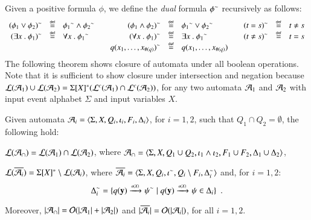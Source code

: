 Given a positive formula $\phi$, we define the \emph{dual} formula
${\phi}^{\sim}$ recursively as follows:
\[\begin{array}{rclcrclcrcl}
{(\phi_1 \vee \phi_2)}^{\sim} & \stackrel{\scriptscriptstyle{\mathsf{def}}}{=} & {\phi_1}^{\sim} \wedge {\phi_2}^{\sim} && 
{(\phi_1 \wedge \phi_2)}^{\sim} & \stackrel{\scriptscriptstyle{\mathsf{def}}}{=} & {\phi_1}^{\sim} \vee {\phi_2}^{\sim} &&
{(t = s)}^{\sim} & \stackrel{\scriptscriptstyle{\mathsf{def}}}{=} & t \neq s \\
{(\exists x ~.~ \phi_1)}^{\sim} & \stackrel{\scriptscriptstyle{\mathsf{def}}}{=} & \forall x ~.~ {\phi_1}^{\sim} && 
{(\forall x ~.~ \phi_1)}^{\sim} & \stackrel{\scriptscriptstyle{\mathsf{def}}}{=} & \exists x ~.~ {\phi_1}^{\sim} && 
{(t \neq s)}^{\sim} & \stackrel{\scriptscriptstyle{\mathsf{def}}}{=} & t = s \\
&&&& {q(x_1,\ldots,x_{\#(q)})}^{\sim} & \stackrel{\scriptscriptstyle{\mathsf{def}}}{=} & q(x_1,\ldots,x_{\#(q)})
\end{array}\]
The following theorem shows closure of automata under all boolean
operations. Note that it is sufficient to show closure under
intersection and negation because ${\mathcal L}({\mathcal{A}_1}) \cup {\mathcal L}({\mathcal{A}_2}) =
\Sigma[X]^* ({\mathcal L}^c({\mathcal{A}_1}) \cap {\mathcal L}^c({\mathcal{A}_2}))$, for any two automata
$\mathcal{A}_1$ and $\mathcal{A}_2$ with input event alphabet $\Sigma$ and input
variables $X$.


\begin{theorem}\label{thm:closure}
  Given automata $\mathcal{A}_i = \langle \Sigma,X,Q_i,\iota_i,F_i,\Delta_i \rangle$,
  for $i=1,2$, such that $Q_1 \cap Q_2 = \emptyset$, the following hold: 
  \begin{compactenum}
    \item\label{it1:thm:closure} ${\mathcal L}({\mathcal{A}_\cap}) = {\mathcal L}({\mathcal{A}_1}) \cap {\mathcal L}({\mathcal{A}_2})$, where
      $\mathcal{A}_\cap = \langle \Sigma,X,Q_1 \cup Q_2, \iota_1 \wedge \iota_2,
      F_1 \cup F_2, \Delta_1 \cup \Delta_2 \rangle$, 
    \item\label{it2:thm:closure} ${\mathcal L}({\overline{\mathcal{A}_i}}) = \Sigma[X]^*
      \setminus {\mathcal L}({\mathcal{A}_i})$, where $\overline{\mathcal{A}_i} =
      \langle \Sigma,X,Q_i,{\iota}^{\sim},Q_i\setminus
        F_i,{\Delta}^{\sim}_i \rangle$ and, for $i=1,2$: \[{\Delta}^{\sim}_i =
      \{ q(\mathbf y) \xrightarrow{{\scriptscriptstyle a(X)}}_{{\scriptstyle }} {\psi}^{\sim} \mid
        q(\mathbf y) \xrightarrow{{\scriptscriptstyle a(X)}}_{{\scriptstyle }} \psi \in
        \Delta_i \}\enspace.\]
  \end{compactenum}
  Moreover, ${|{\mathcal{A}_\cap}|} = \mathcal{O}({{|{\mathcal{A}_1}|}+{|{\mathcal{A}_2}|}})$ and
  ${|{\overline{\mathcal{A}_i}}|} = \mathcal{O}({{|{\mathcal{A}_i}|}})$, for all $i=1,2$.
\end{theorem}
\ifLongVersion\else
